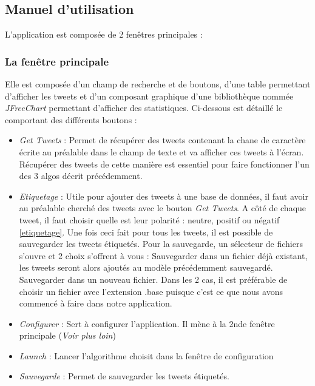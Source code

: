 \documentclass[a4paper,10pt]{report}
\begin{document}
    
    \subsection{Manuel d'utilisation}
      L'application est composée de 2 fenêtres principales :

      \subsubsection{La fenêtre principale}
	Elle est composée d'un champ de recherche et de boutons, d'une table permettant d'afficher les tweets et
	d'un composant graphique d'une bibliothèque nommée \textit{JFreeChart} permettant d'afficher des statistiques.
	Ci-dessous est détaillé le comportant des différents boutons :
	\begin{itemize}
	 \item \textit{Get Tweets} : Permet de récupérer des tweets contenant la chane de caractère écrite au préalable dans le champ de texte et va afficher ces tweets à l'écran.
	    Récupérer des tweets de cette manière est essentiel pour faire fonctionner l'un des 3 algos décrit précédemment.
	 \item \textit{Etiquetage} : Utile pour ajouter des tweets à une base de données, il faut avoir au préalable cherché des tweets avec le bouton \textit{Get Tweets}.
	    A côté de chaque tweet, il faut choisir quelle est leur polarité : neutre, positif ou négatif \ref{etiquetage}. Une fois ceci fait pour tous les tweets,
	    il est possible de sauvegarder les tweets étiquetés. Pour la sauvegarde, un sélecteur de fichiers s'ouvre et 2 choix s'offrent à vous :
	    Sauvegarder dans un fichier déjà existant, les tweets seront alors ajoutés au modèle précédemment sauvegardé.
	    Sauvegarder dans un nouveau fichier.  
	    Dans les 2 cas, il est préférable de choisir un fichier avec l'extension .base puisque c'est ce que nous avons commencé à faire dans notre application.
	\item \textit{Configurer} : Sert à configurer l'application. Il mène à la 2nde fenêtre principale (\textit{Voir plus loin})
	\item \textit{Launch} : Lancer l'algorithme choisit dans la fenêtre de configuration
	\item \textit{Sauvegarde} : Permet de sauvegarder les tweets étiquetés.
	\end{itemize}
\end{document}
